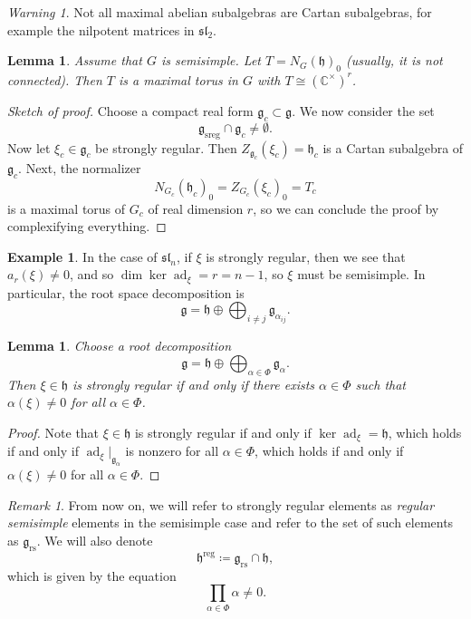 \documentclass{amsart}
\newtheorem{lem}[thm]{Lemma}
\theoremstyle{definition}
\newtheorem{exm}[thm]{Example}
\theoremstyle{remark}
\newtheorem{rmk}[thm]{Remark}
\newtheorem{warn}[thm]{Warning}
\theoremstyle{plain}
\theoremstyle{definition}
\theoremstyle{remark}
\newcommand{\C}{\mathbb{C}}
\newcommand{\g}{\mathfrak{g}}
\newcommand{\h}{\mathfrak{h}}
\newcommand{\mf}[1]{\mathfrak{#1}}
\newcommand{\mr}[1]{\mathrm{#1}}
\newcommand{\on}[1]{\operatorname{#1}}
\newcommand{\1}{\mathbf{1}}
\newcommand{\2}{\mathbf{2}}
\newcommand{\3}{\mathbf{3}}
\renewcommand{\sl}{\mf{sl}}
\DeclareMathOperator{\ad}{ad}
\begin{document}
\begin{warn}
    Not all maximal abelian subalgebras are Cartan subalgebras, for example the nilpotent matrices in \(\sl_2\).
\end{warn}

\begin{lem}
    Assume that \(G\) is semisimple. Let \(T = N_G(\h)_0\) (usually, it is not connected). Then \(T\) is a maximal torus in \(G\) with \(T \cong {(\C^{\times})}^r\).
\end{lem}

\begin{proof}[Sketch of proof]
    Choose a compact real form \(\g_c \subset \g\). We now consider the set
    \[ \g_{\mr{sreg}} \cap \g_c \neq \emptyset. \]
    Now let \(\xi_c \in \g_c\) be strongly regular. Then \(Z_{\g_c}(\xi_c) = \h_c\) is a Cartan subalgebra of \(\g_c\). Next, the normalizer
    \[ N_{G_c}{(\h_c)}_0 = Z_{G_c}{(\xi_c)}_0 = T_c \]
    is a maximal torus of \(G_c\) of real dimension \(r\), so we can conclude the proof by complexifying everything.
\end{proof}

\begin{exm}
    In the case of \(\sl_n\), if \(\xi\) is strongly regular, then we see that \(a_r(\xi) \neq 0\), and so \(\dim \ker \ad_{\xi} = r = n-1\), so \(\xi\) must be semisimple. In particular, the root space decomposition is
    \[ \g = \h \oplus \bigoplus_{i \neq j} \g_{\alpha_{ij}}. \]
\end{exm}

\begin{lem}
    Choose a root decomposition
    \[ \g = \h \oplus \bigoplus_{\alpha \in \Phi} \g_{\alpha}. \]
    Then \(\xi \in \h\) is strongly regular if and only if there exists \(\alpha \in \Phi\) such that \(\alpha(\xi) \neq 0\) for all \(\alpha \in \Phi\).
\end{lem}

\begin{proof}
    Note that \(\xi \in \h\) is strongly regular if and only if \(\ker \ad_{\xi} = \h\), which holds if and only if \(\ad_{\xi}|_{\g_{\alpha}}\) is nonzero for all \(\alpha \in \Phi\), which holds if and only if \(\alpha(\xi) \neq 0\) for all \(\alpha \in \Phi\).
\end{proof}

\begin{rmk}
    From now on, we will refer to strongly regular elements as \textit{regular semisimple} elements in the semisimple case and refer to the set of such elements as $\g_{\mr{rs}}$. We will also denote
    \[ \h^{\on{reg}} \coloneqq \g_{\mr{rs}} \cap \h, \]
    which is given by the equation
    \[ \prod_{\alpha \in \Phi} \alpha \neq 0. \]
\end{rmk}
\end{document}
